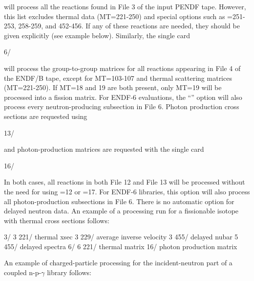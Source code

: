 \noindent
will process all the reactions found in File 3 of the input PENDF tape.
However, this list excludes thermal data (MT=221-250) and special
options such as =251-253, 258-259, and 452-456.  If any of these
reactions are needed, they should be given explicitly (see example below).
Similarly, the single card

\small
\begin{ccode}

   6/

\end{ccode}
\normalsize


\noindent
will process the group-to-group matrices for all reactions appearing in
File 4 of the ENDF/B tape, except for MT=103-107 and thermal scattering
matrices (MT=221-250).  If MT=18 and 19 are both present, only MT=19
will be processed into a fission matrix.  For ENDF-6 evaluations, the
``'' option will also process every neutron-producing subsection in
File 6.  Photon production cross sections are requested using

\small
\begin{ccode}

   13/

\end{ccode}
\normalsize

\noindent
and photon-production matrices are requested with the single card

\small
\begin{ccode}

   16/

\end{ccode}
\normalsize

\noindent
In both cases, all reactions in both File 12 and File 13 will be processed
without the need for using =12 or =17.  For ENDF-6
libraries, this option will also process all photon-production subsections
in File 6.  There is no automatic option for delayed neutron data.  An
example of a processing run for a fissionable isotope with thermal
cross sections follows:

\small
\begin{ccode}

   3/
   3 221/ thermal xsec
   3 229/ average inverse velocity
   3 455/ delayed nubar
   5 455/ delayed spectra
   6/
   6 221/ thermal matrix
   16/ photon production matrix

\end{ccode}
\normalsize

\noindent
An example of charged-particle processing for the incident-neutron
part of a coupled n-p-$\gamma$ library follows:

